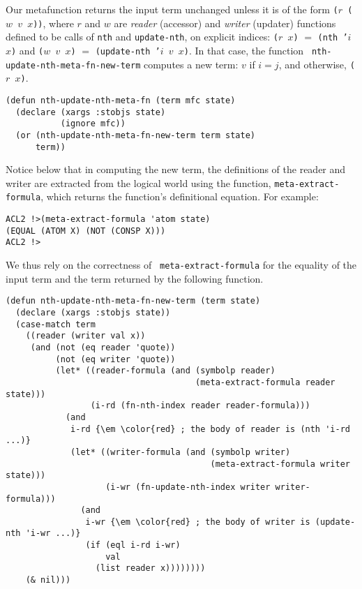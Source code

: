 Our metafunction returns the input term unchanged unless it is of the
form {\tt ($r$ ($w$ $v$ $x$))}, where $r$ and $w$ are {\em reader}
(accessor) and {\em writer} (updater) functions defined to be calls of
{\tt nth} and {\tt update-nth}, on explicit indices: {\tt ($r$ $x$)}
$=$ {\tt (nth '$i$ $x$)} and {\tt ($w$ $v$ $x$)} $=$ {\tt (update-nth
  '$i$ $v$ $x$)}.  In that case, the function {\tt
  nth-update-nth-meta-fn-new-term} computes a new term: $v$ if $i =
j$, and otherwise, {\tt ($r$ $x$)}.

\begin{verbatim}
(defun nth-update-nth-meta-fn (term mfc state)
  (declare (xargs :stobjs state)
           (ignore mfc))
  (or (nth-update-nth-meta-fn-new-term term state)
      term))
\end{verbatim}

Notice below that in computing the new term, the definitions of the
reader and writer are extracted from the logical world using the
function, {\tt meta-extract-formula}, which returns the function's
definitional equation.  For example:

\begin{verbatim}
ACL2 !>(meta-extract-formula 'atom state)
(EQUAL (ATOM X) (NOT (CONSP X)))
ACL2 !>
\end{verbatim}

\noindent We thus rely on the correctness of {\tt
  meta-extract-formula} for the equality of the input term and the
term returned by the following function.

\begin{Verbatim}[commandchars=\\\{\},fontsize=\small]
(defun nth-update-nth-meta-fn-new-term (term state)
  (declare (xargs :stobjs state))
  (case-match term
    ((reader (writer val x))
     (and (not (eq reader 'quote))
          (not (eq writer 'quote))
          (let* ((reader-formula (and (symbolp reader)
                                      (meta-extract-formula reader state)))
                 (i-rd (fn-nth-index reader reader-formula)))
            (and
             i-rd {\em \color{red} ; the body of reader is (nth 'i-rd ...)}
             (let* ((writer-formula (and (symbolp writer)
                                         (meta-extract-formula writer state)))
                    (i-wr (fn-update-nth-index writer writer-formula)))
               (and
                i-wr {\em \color{red} ; the body of writer is (update-nth 'i-wr ...)}
                (if (eql i-rd i-wr)
                    val
                  (list reader x))))))))
    (& nil)))
\end{Verbatim}

